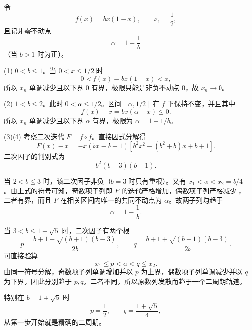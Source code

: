 \begin{xsolution}
令
\[
  f(x)=bx(1-x),\qquad x_1=\frac12,
\]
且记非零不动点
\[
  \alpha=1-\frac1b
\]
（当 $b>1$ 时为正）。

(1) $0<b\le1$。当 $0<x\le1/2$ 时
\[
  0<f(x)=bx(1-x)<x,
\]
所以 $x_n$ 单调减少且以下界 $0$ 有界，极限只能是非负不动点 $0$，故 $x_n\to0$。

(2) $1<b\le2$。此时 $0<\alpha\le1/2$。区间 $[\alpha,1/2]$ 在 $f$ 下保持不变，并且其中
\[
  f(x)-x=bx(\alpha-x)\le0.
\]
所以 $x_n$ 单调减少且以下界 $\alpha$ 有界，极限为 $\alpha=1-1/b$。

(3)(4) 考察二次迭代 $F=f\circ f$。直接因式分解得
\[
  F(x)-x
  =-x(bx-b+1)
  \left[b^2x^2-(b^2+b)x+b+1\right].
\]
二次因子的判别式为
\[
  b^2(b-3)(b+1).
\]

当 $2<b\le3$ 时，该二次因子非负（$b=3$ 时只有重根）。又有 $x_1<\alpha<x_2=b/4$。由上式的符号可知，奇数项子列即 $F$ 的迭代严格增加，偶数项子列严格减少；二者有界，而且 $F$ 在相关区间内唯一的共同不动点为 $\alpha$。故两子列均趋于
\[
  \boxed{\alpha=1-\frac1b}.
\]

当 $3<b\le1+\sqrt5$ 时，二次因子有两个根
\[
  p=\frac{b+1-\sqrt{(b+1)(b-3)}}{2b},
  \qquad
  q=\frac{b+1+\sqrt{(b+1)(b-3)}}{2b}.
\]
可直接验算
\[
  x_1\le p<\alpha<q\le x_2.
\]
由同一符号分解，奇数项子列单调增加并以 $p$ 为上界，偶数项子列单调减少并以 $q$ 为下界，因此分别趋于 $p,q$。二者不同，所以原数列发散而趋于一个二周期轨道。

特别在 $b=1+\sqrt5$ 时
\[
  p=\frac12,
  \qquad
  q=\frac{1+\sqrt5}{4},
\]
从第一步开始就是精确的二周期。
\end{xsolution}


